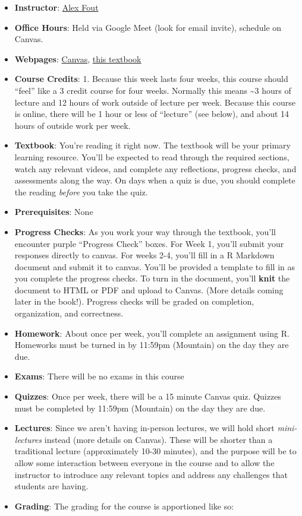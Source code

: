 \documentclass[
]{article}
\begin{document}
\begin{itemize}
\item
  \textbf{Instructor}: \href{mailto:fout@colostate.edu}{Alex Fout}
\item
  \textbf{Office Hours}: Held via Google Meet (look for email invite), schedule on Canvas.
\item
  \textbf{Webpages}: \href{https://canvas.colostate.edu}{Canvas}, \href{https://csu-r.github.io/Module1/}{this textbook}
\item
  \textbf{Course Credits}: 1. Because this week lasts four weeks, this course should ``feel'' like a 3 credit course for four weeks. Normally this means \textasciitilde3 hours of lecture and 12 hours of work outside of lecture per week. Because this course is online, there will be 1 hour or less of ``lecture'' (see below), and about 14 hours of outside work per week.
\item
  \textbf{Textbook}: You're reading it right now. The textbook will be your primary learning resource. You'll be expected to read through the required sections, watch any relevant videos, and complete any reflections, progress checks, and assessments along the way. On days when a quiz is due, you should complete the reading \emph{before} you take the quiz.
\item
  \textbf{Prerequisites}: None
\item
  \textbf{Progress Checks}: As you work your way through the textbook, you'll encounter purple ``Progress Check'' boxes. For Week 1, you'll submit your responses directly to canvas. For weeks 2-4, you'll fill in a R Markdown document and submit it to canvas. You'll be provided a template to fill in as you complete the progress checks. To turn in the document, you'll \textbf{knit} the document to HTML or PDF and upload to Canvas. (More details coming later in the book!). Progress checks will be graded on completion, organization, and correctness.
\item
  \textbf{Homework}: About once per week, you'll complete an assignment using R. Homeworks must be turned in by 11:59pm (Mountain) on the day they are due.
\item
  \textbf{Exams}: There will be no exams in this course
\item
  \textbf{Quizzes}: Once per week, there will be a 15 minute Canvas quiz. Quizzes must be completed by 11:59pm (Mountain) on the day they are due.
\item
  \textbf{Lectures}: Since we aren't having in-person lectures, we will hold short \emph{mini-lectures} instead (more details on Canvas). These will be shorter than a traditional lecture (approximately 10-30 minutes), and the purpose will be to allow some interaction between everyone in the course and to allow the instructor to introduce any relevant topics and address any challenges that students are having.
\item
  \textbf{Grading}: The grading for the course is apportioned like so:


\end{itemize}
\end{document}
